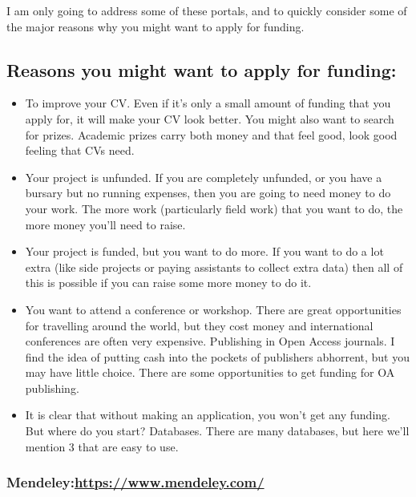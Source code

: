 \documentclass[
]{krantz}
\providecommand{\tightlist}{%
  \setlength{\itemsep}{0pt}\setlength{\parskip}{0pt}}
\begin{document}
I am only going to address some of these portals, and to quickly consider some of the major reasons why you might want to apply for funding.

\hypertarget{reasons-you-might-want-to-apply-for-funding}{%
\subsection{Reasons you might want to apply for funding:}\label{reasons-you-might-want-to-apply-for-funding}}

\begin{itemize}
\tightlist
\item
  To improve your CV. Even if it's only a small amount of funding that you apply for, it will make your CV look better. You might also want to search for prizes. Academic prizes carry both money and that feel good, look good feeling that CVs need.
\item
  Your project is unfunded. If you are completely unfunded, or you have a bursary but no running expenses, then you are going to need money to do your work. The more work (particularly field work) that you want to do, the more money you'll need to raise.
\item
  Your project is funded, but you want to do more. If you want to do a lot extra (like side projects or paying assistants to collect extra data) then all of this is possible if you can raise some more money to do it.
\item
  You want to attend a conference or workshop. There are great opportunities for travelling around the world, but they cost money and international conferences are often very expensive.
  Publishing in Open Access journals. I find the idea of putting cash into the pockets of publishers abhorrent, but you may have little choice. There are some opportunities to get funding for OA publishing.
\item
  It is clear that without making an application, you won't get any funding. But where do you start?
  Databases. There are many databases, but here we'll mention 3 that are easy to use.
\end{itemize}

\hypertarget{mendeleyhttpswww.mendeley.com}{%
\subsubsection{\texorpdfstring{Mendeley:\url{https://www.mendeley.com/}}{Mendeley:https://www.mendeley.com/}}\label{mendeleyhttpswww.mendeley.com}}
\end{document}
